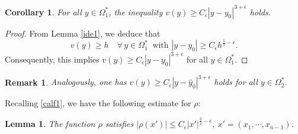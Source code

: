 \documentclass[11pt]{amsart}
\theoremstyle{plain}
\newtheorem{lemma}{Lemma}[section]
\newtheorem{corollary}{Corollary}[section]
\newtheorem{remark}{Remark}[section]
\newcommand{\0}{\textbf{0}}
\numberwithin{equation}{section}
\numberwithin{equation}{section}
\numberwithin{figure}{section}
\begin{document}
\begin{corollary}\label{decayrate1}
For all $y \in \Omega_1^*$, the inequality $v(y) \geq C_\epsilon |y - y_0|^{3 + \epsilon}$ holds.
\end{corollary}
\begin{proof}
From Lemma \ref{ide1}, we deduce that 
	\[ v(y) \geq h \quad \forall\, y \in \Omega_1^*\  \mbox{ with } |y-y_0| \geq C_\epsilon h^{\frac{1}{3} - \epsilon}. \]
Consequently, this implies \( v(y) \geq C_\epsilon |y - y_0|^{3 + \epsilon} \) for all \( y \in \Omega_1^* \).
\end{proof}

\begin{remark}
\emph{ Analogously, one has $v(y) \geq C_\epsilon |y - \hat{y}_0|^{3 + \epsilon}$ holds for all $y \in \Omega_2^*$. }
\end{remark}

Recalling \eqref{calf1}, we have the following estimate for $\rho$:
\begin{lemma}\label{decayrate2}
The function $\rho$ satisfies $|\rho(x')| \leq C_\epsilon |x'|^{\frac{3}{2} - \epsilon}$, $x'=(x_1,\cdots,x_{n-1})$.
\end{lemma}
\end{document}
